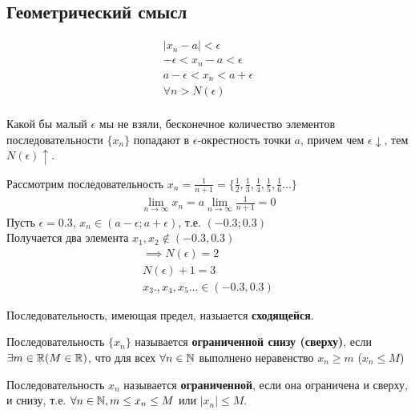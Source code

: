 \subsection{Геометрический смысл}
\begin{gather*}
|x_{n} - a| < \epsilon \\
- \epsilon< x_{n} - a < \epsilon \\
a - \epsilon < x_{n} < a + \epsilon \\
\forall n > N(\epsilon) \\
\end{gather*}

Какой бы малый $\epsilon$ мы не взяли, бесконечное количество элементов последовательности $\{x_{n}\}$ попадают в $\epsilon$-окрестность точки $a$, причем чем $\epsilon \downarrow$, тем  $N(\epsilon) \uparrow$.

\begin{eg}
  Рассмотрим последовательность $x_{n} = \frac{1}{n+1} = \{ \frac{1}{2}, \frac{1}{3}, \frac{1}{4}, \frac{1}{5}, \frac{1}{6}\ldots \} $
  \begin{gather*}
    \lim_{n \to \infty} x_{n} = a
    \lim_{n \to \infty} \frac{1}{n+1} = 0
  \end{gather*}
  Пусть $\epsilon = 0.3$, $x_{n}\in (a-\epsilon; a+\epsilon)$, т.е. $(-0.3; 0.3)$ \\
  Получается два элемента $x_1, x_2 \not\in (-0.3, 0.3)$
  \begin{gather*}
    \implies N(\epsilon) = 2 \\
    N(\epsilon) + 1 = 3 \\
    x_3., x_4, x_5 \ldots \in (-0.3, 0.3) 
  \end{gather*}
\end{eg}

\begin{definition}
  Последовательность, имеющая предел, назыается \textbf{сходящейся}.
\end{definition}

\begin{definition}
  Последовательность $\{x_{n}\} $ называется \textbf{ограниченной снизу (сверху)}, если $\exists m \in \mathbb{R} (M \in \mathbb{R})$, что для всех $\forall n \in \mathbb{N}$ выполнено неравенство $x_{n} \ge m$ ($x_{n} \le M$)
\end{definition}

\begin{definition}
  Последовательность $x_{n}$ называется \textbf{ограниченной}, если она ограничена и сверху, и снизу, т.е. $\forall n \in \mathbb{N}, m \le x_{n} \le M$ или $|x_{n}| \le M$.
\end{definition}

